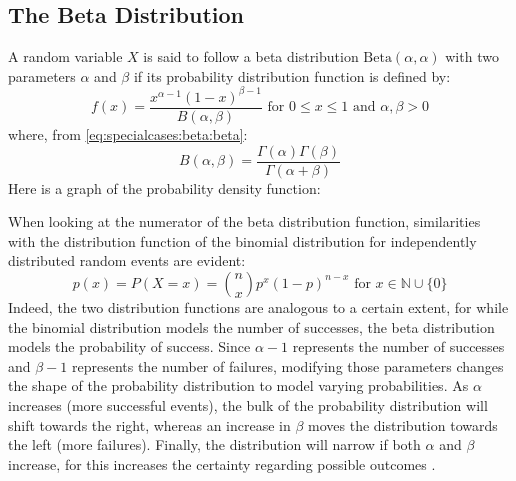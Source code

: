 \documentclass[12pt]{article}
\begin{document}

\pagebreak
\subsection{The Beta Distribution}\label{subsec:specialcases:beta}
A random variable $X$ is said to follow a beta distribution $\text{Beta}(\alpha, \alpha)$ with two parameters $\alpha$
and $\beta$ if its probability distribution function is defined by:
\begin{equation}\label{eq:specialcases:beta:pdf}
	f(x) = \frac{x^{\alpha-1} (1-x)^{\beta-1}}{B(\alpha, \beta)}\text{ for } 0\leq x\leq 1\text{ and }\alpha, \beta > 0
\end{equation}
where, from \autoref{eq:specialcases:beta:beta}:
\begin{equation}
	B(\alpha, \beta) = \frac{\Gamma(\alpha)\Gamma(\beta)}{\Gamma(\alpha+\beta)}
\end{equation}
 Here is a graph of the probability density function:


\pagebreak
When looking at the numerator of the beta distribution function, similarities with the distribution function of the
binomial distribution for independently distributed random events are evident:
\begin{equation}
	p(x) = P(X=x) =\binom{n}{x}p^x(1-p)^{n-x}\text{ for }x\in\mathbb{N}\cup\{0\}
\end{equation}
Indeed, the two distribution functions are analogous to a certain extent, for while the binomial distribution models the
number of successes, the beta distribution models the probability of success. Since $\alpha-1$ represents the number
of successes and $\beta-1$ represents the number of failures, modifying those parameters changes the shape of the
probability distribution to model varying probabilities. As $\alpha$ increases (more successful events), the bulk of the
probability distribution will shift towards the right, whereas an increase in $\beta$ moves the distribution towards the
left (more failures). Finally, the distribution will narrow if both $\alpha$ and $\beta$ increase, for this increases the
certainty regarding possible outcomes \cite{kimBetaDistributionIntuition2020, disorboBetaGamma}.
\end{document}
